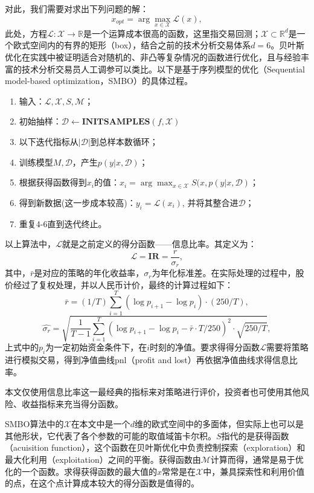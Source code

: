 \documentclass[twoside,longtitle]{LZUthesis}
\begin{document}
对此，我们需要对求出下列问题的解：
\begin{equation}
x_{opt}=\arg\max_{x\in\mathcal{X}}\mathcal{L}(x),
\end{equation}
此处，方程$\mathcal{L}:\mathcal{X}\rightarrow\mathbb{R}$是一个运算成本很高的函数，这里指交易回测；$\mathcal{X}\subset \mathbb{R}^d$是一个欧式空间内的有界的矩形（box），结合之前的技术分析交易体系$d=6$。贝叶斯优化在实践中被证明适合对随机的、非凸等复杂情况的函数进行优化，且与经验丰富的技术分析交易员人工调参可以类比。以下是基于序列模型的优化（Sequential model-based optimization，SMBO）的具体过程。


\begin{enumerate}
	\item 输入：$\mathcal{L},\mathcal{X}, S, \mathcal{M}$；
	\item 初始抽样：$\mathcal{D}\longleftarrow \mathbf{INIT SAMPLES}(f,\mathcal{X})$
	\item 以下迭代指标从$|\mathcal{D}|$到总样本数循环；
	\item 训练模型$M, \mathcal{D}$，产生$p(y|x,\mathcal{D})$；
	\item 根据获得函数得到$x_i$的值：$x_i=\arg\max_{x\in\mathcal{X}} S(x, p(y|x, \mathcal{D})$；
	\item 得到新数据(这一步成本较高)：$y_i=\mathcal{L}(x_i)$, 并将其整合进$\mathcal{D}$；
	\item 重复4-6直到迭代终止。
\end{enumerate}

以上算法中，$\mathcal{L}$就是之前定义的得分函数——信息比率。其定义为：
\[
\mathcal{L}=\mathbf{IR}=\frac{r}{\sigma_r},
\]
其中，$\bar{r}$是对应的策略的年化收益率，$\sigma_r$为年化标准差。在实际处理的过程中，股价经过了复权处理，并以人民币计价，最终的计算过程如下：
\[
\bar{r}=(1/T)\sum_{i=1}^{T}(\log{p_{i+1}}-\log{p_{i}})\cdot(250/T),
\]
\[
\hat{\sigma_r} = \sqrt{\frac{1}{T-1}\sum_{i=1}^{T}(\log{p_{i+1}}-\log{p_{i}}-\bar{r}\cdot T/250)^2\cdot\sqrt{250/T}},
\]
上式中的$p_i$为一定初始资金条件下，在$i$时刻的净值。要求得得分函数$\mathcal{L}$需要将策略进行模拟交易，得到净值曲线pnl（profit and lost）再依据净值曲线求得信息比率。

本文仅使用信息比率这一最经典的指标来对策略进行评价，投资者也可使用其他风险、收益指标来充当得分函数。

SMBO算法中的$\mathcal{X}$在本文中是一个$d$维的欧式空间中的多面体，但实际上也可以是其他形状，它代表了各个参数的可能的取值域笛卡尔积。$S$指代的是获得函数（acuisition function），这个函数在贝叶斯优化中负责控制探索（exploration）和最大化利用（exploitation）之间的平衡。获得函数由$\mathcal{M}$计算而得，通常是易于优化的一个函数。求得获得函数的最大值的$x$常常是在$\mathcal{X}$中，兼具探索性和利用价值的点，在这个点计算成本较大的得分函数是值得的。
\end{document}
